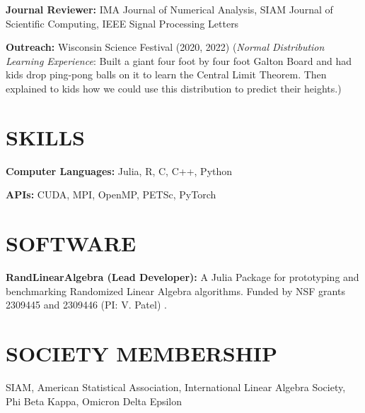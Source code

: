 \documentclass[margin,11pt]{res}
\begin{document}
\begin{resume}
\textbf{Journal Reviewer:} IMA Journal of Numerical Analysis, SIAM Journal of Scientific Computing, IEEE Signal Processing Letters

\textbf{Outreach:} Wisconsin Science Festival (2020, 2022) (\textit{Normal Distribution Learning Experience}: Built a giant four foot by four foot Galton Board and had kids drop ping-pong balls on it to learn the Central Limit Theorem. Then explained to kids how we could use this distribution to predict their heights.)
\section{SKILLS}
\textbf{Computer Languages:} Julia, R, C, C++, Python

\textbf{APIs:} CUDA, MPI, OpenMP, PETSc, PyTorch
\section{SOFTWARE}
\textbf{RandLinearAlgebra (Lead Developer):}  A Julia Package for prototyping and benchmarking Randomized Linear Algebra algorithms. Funded by NSF grants 2309445 and 2309446 (PI: V. Patel) .\\


\section{SOCIETY MEMBERSHIP}
SIAM, American Statistical Association, International Linear Algebra Society, Phi Beta Kappa, Omicron Delta Epsilon
\end{resume} 
\end{document}
